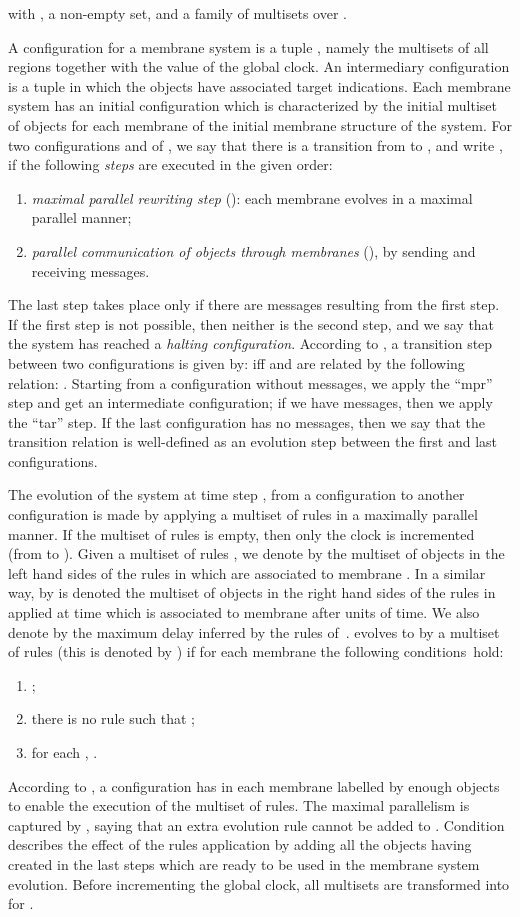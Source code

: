 \documentclass{eptcs}
\begin{document}
\noindent
with ,  a non-empty
set, and  a family of multisets over .

A configuration for a membrane system is a tuple
, namely the multisets of all regions together
with the value of the global clock. An intermediary configuration is
a tuple in which the objects have associated target indications.
Each membrane system has an initial configuration which is
characterized by the initial multiset of objects for each membrane
of the initial membrane structure of the system.
For two configurations  and  of , we say that there is a
transition from  to , and write , if the
following {\it steps} are executed in the given order:
\begin{enumerate}
\item {\em maximal parallel rewriting step}
():
each membrane evolves in a maximal parallel manner;
\item {\em parallel communication of objects through membranes}
(), by sending and receiving messages.
\end{enumerate}
The last step takes place only if there are messages resulting from
the first step. If the first step is not possible, then neither is
the second step, and we say that the system has reached a {\em halting
configuration}. According to \cite{Andrei07}, a transition step
between two configurations  is given by: 
iff  and  are related by the following relation: .
Starting from a configuration without messages, we apply the ``mpr''
step and get an intermediate configuration; if we have messages,
then we apply the ``tar'' step. If the last configuration has no
messages, then we say that the transition relation  is
well-defined as an evolution step between the first and last
configurations.

The evolution of the system  at time step , from a
configuration  to another configuration
 is made by applying
a multiset of rules  in a maximally parallel manner.
If the multiset  of rules is empty, then
only the clock is incremented (from  to ).
Given a multiset of rules ,
we denote by  the multiset
of objects in the left hand sides of the rules in  which are
associated to membrane . In a similar way, by
 is
denoted the multiset of objects in the right hand sides of the rules
in  applied at time  which is associated to membrane  after
 units of time. We also denote by  the
maximum delay inferred by the rules of~.  evolves to  by a
multiset  of rules (this is denoted by
) if for each membrane  the
following conditions~hold:
\begin{enumerate}
\item[] ;
\item[] there is no rule  such that
;
\item[] for each , .
\end{enumerate}
According to , a configuration  has in each membrane labelled by 
enough objects to enable the execution of the multiset  of rules.
The maximal parallelism is captured by , saying that an extra
evolution rule cannot be added to . Condition  describes
the effect of the rules application by adding all the objects having
 created in the last  steps which are ready to be
used in the membrane system evolution. Before incrementing the
global clock, all multisets  are transformed into
 for .
\end{document}
